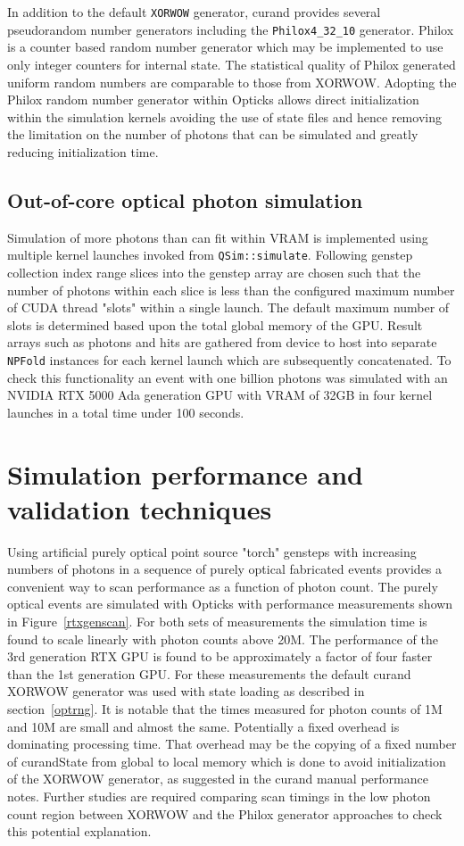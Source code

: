 \documentclass{webofc}
\begin{document}
In addition to the default {\tt XORWOW} generator, curand provides several 
pseudorandom number generators including the {\tt Philox4\_32\_10} generator.
Philox is a counter based random number generator which may be implemented to 
use only integer counters for internal state. 
The statistical quality of Philox generated uniform random numbers are comparable 
to those from XORWOW\cite{curand}.
Adopting the Philox random number generator within Opticks allows direct initialization within
the simulation kernels avoiding the use of state files and hence removing the 
limitation on the number of photons that can be simulated and greatly reducing 
initialization time. 
%
\subsection{Out-of-core optical photon simulation}
%
Simulation of more photons than can fit within VRAM is implemented
using multiple kernel launches invoked from {\tt QSim::simulate}. 
Following genstep collection index range slices into the genstep array 
are chosen such that the number of photons within each slice is less than 
the configured maximum number of CUDA thread "slots" within a single launch.
The default maximum number of slots is determined based upon the total
global memory of the GPU. Result arrays such as photons and hits are gathered
from device to host into separate {\tt NPFold} instances for each kernel launch 
which are subsequently concatenated. To check this functionality 
an event with one billion photons was simulated with an NVIDIA RTX 5000 Ada 
generation GPU with VRAM of 32GB in four kernel launches 
in a total time under 100 seconds. 
%
\section{Simulation performance and validation techniques}
%
Using artificial purely optical point source "torch" gensteps with increasing numbers of photons in a sequence of 
purely optical fabricated events provides a convenient way to scan performance as 
a function of photon count. The purely optical events are simulated with Opticks with
performance measurements shown in Figure~\ref{rtxgenscan}.
For both sets of measurements the simulation time is found to scale linearly with photon counts
above 20M. The performance of the 3rd generation RTX GPU is found to be approximately a factor of four faster 
than the 1st generation GPU. For these measurements the default curand XORWOW generator 
was used with state loading as described in section~\ref{optrng}.  
It is notable that the times measured for photon counts of 1M and 10M 
are small and almost the same. Potentially a fixed overhead is dominating 
processing time. That overhead may be the copying of a fixed number of curandState 
from global to local memory which is done to avoid initialization of the XORWOW generator, 
as suggested in the curand manual performance notes\cite{curand}.  
Further studies are required comparing scan timings in the low photon count region 
between XORWOW and the Philox generator approaches to check this potential explanation. 
\end{document}
